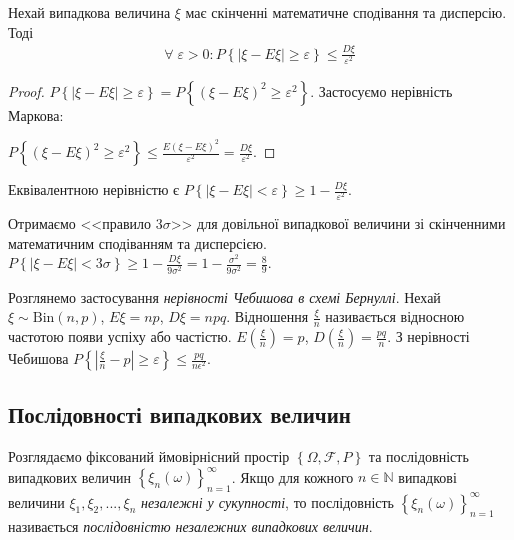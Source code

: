 \begin{theorem*}
    Нехай випадкова величина $\xi$ має скінченні математичне сподівання та дисперсію.
Тоді
\begin{gather}\label{Cheb_ineq}
    \forall \; \varepsilon >0 : P\left\{ \left|\xi - E\xi\right| \geq \varepsilon\right\} \leq \frac{D\xi}{\varepsilon^2}
\end{gather}
\end{theorem*} 
\begin{proof}
    $P\left\{ |\xi - E\xi| \geq \varepsilon\right\} = P\left\{ (\xi - E\xi)^2 \geq \varepsilon^2\right\}$.
    Застосуємо нерівність Маркова:
    
    \noindent $P\left\{ (\xi - E\xi)^2 \geq \varepsilon^2\right\} \leq \frac{E(\xi - E\xi)^2}{\varepsilon^2} = \frac{D\xi}{\varepsilon^2}$.
\end{proof}
\begin{remark}
    Еквівалентною нерівністю є $P\left\{ \left|\xi - E\xi\right| < \varepsilon\right\} \geq 1 - \frac{D\xi}{\varepsilon^2}$.
\end{remark}
\begin{example}
    Отримаємо <<правило $3 \sigma$>> для довільної випадкової величини зі скінченними математичним сподіванням та дисперсією.
    $P\left\{ |\xi - E\xi| < 3 \sigma\right\} \geq 1 - \frac{D\xi}{9 \sigma^2} = 1 - \frac{\sigma^2}{9 \sigma^2} = \frac{8}{9}$.
\end{example}
Розглянемо застосування \emph{нерівності Чебишова в схемі Бернуллі}. Нехай $\xi \sim \mathrm{Bin}(n, p)$, $E\xi = np$, $D\xi = npq$.
Відношення $\frac{\xi}{n}$ називається відносною частотою появи успіху або частістю. $E\left( \frac{\xi}{n}\right) = p$, 
$D\left( \frac{\xi}{n}\right) = \frac{pq}{n}$. З нерівності Чебишова 
$P\left\{ \left|\frac{\xi}{n} - p\right| \geq \varepsilon\right\} \leq \frac{pq}{n \epsilon^2}$.

\subsection{Послідовності випадкових величин}
Розглядаємо фіксований ймовірнісний простір $\left\{ \Omega, \mathcal{F}, P\right\}$ та
послідовність випадкових величин $\left\{ \xi_n (\omega)\right\}_{n=1}^{\infty}$.
Якщо для кожного $n \in \mathbb{N}$ випадкові величини $\xi_1, \xi_2, ..., \xi_n$ \emph{незалежні у сукупності},
то послідовність $\left\{ \xi_n (\omega)\right\}_{n=1}^{\infty}$ називається \emph{послідовністю незалежних випадкових величин}.

